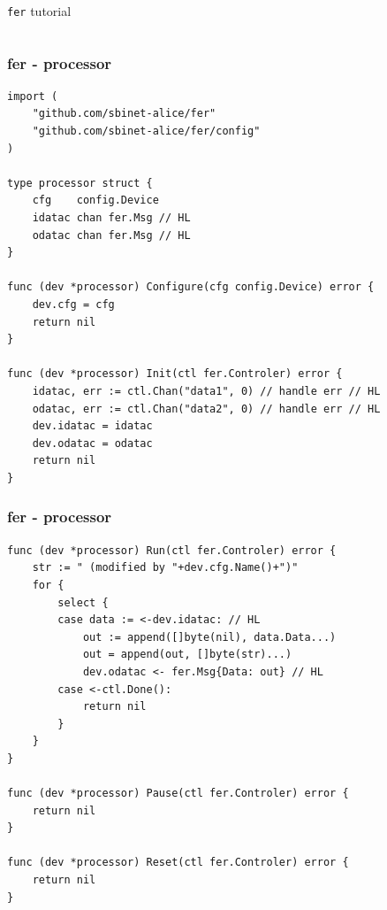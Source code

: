 \documentclass[9pt]{beamer}
\begin{document}
\begin{frame}[fragile]

	\begin{columns}
		\begin{column}{0.49\textwidth}
			\begin{block}{}
				\begin{center}
				\texttt{fer} tutorial
				\end{center}
			\end{block}
		\end{column}
	\end{columns}


\end{frame}

\begin{frame}[fragile]
\frametitle{fer - processor}


\begin{verbatim}
import (
	"github.com/sbinet-alice/fer"
	"github.com/sbinet-alice/fer/config"
)

type processor struct {
	cfg    config.Device
	idatac chan fer.Msg // HL
	odatac chan fer.Msg // HL
}

func (dev *processor) Configure(cfg config.Device) error {
	dev.cfg = cfg
	return nil
}

func (dev *processor) Init(ctl fer.Controler) error {
	idatac, err := ctl.Chan("data1", 0) // handle err // HL
	odatac, err := ctl.Chan("data2", 0) // handle err // HL
	dev.idatac = idatac
	dev.odatac = odatac
	return nil
}

\end{verbatim}


\end{frame}

\begin{frame}[fragile]
\frametitle{fer - processor}


\begin{verbatim}
func (dev *processor) Run(ctl fer.Controler) error {
	str := " (modified by "+dev.cfg.Name()+")"
	for {
		select {
		case data := <-dev.idatac: // HL
			out := append([]byte(nil), data.Data...)
			out = append(out, []byte(str)...)
			dev.odatac <- fer.Msg{Data: out} // HL
		case <-ctl.Done():
			return nil
		}
	}
}

func (dev *processor) Pause(ctl fer.Controler) error {
	return nil
}

func (dev *processor) Reset(ctl fer.Controler) error {
	return nil
}

\end{verbatim}


\end{frame}
\end{document}
